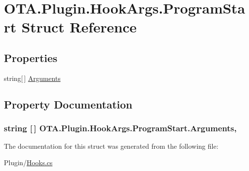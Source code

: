 \hypertarget{struct_o_t_a_1_1_plugin_1_1_hook_args_1_1_program_start}{}\section{O\+T\+A.\+Plugin.\+Hook\+Args.\+Program\+Start Struct Reference}
\label{struct_o_t_a_1_1_plugin_1_1_hook_args_1_1_program_start}
\subsection*{Properties}
\begin{DoxyCompactItemize}
\item 
string\mbox{[}$\,$\mbox{]} \hyperlink{struct_o_t_a_1_1_plugin_1_1_hook_args_1_1_program_start_a7068b440d42594330a4daea4f2c1a005}{Arguments}
\end{DoxyCompactItemize}


\subsection{Property Documentation}
\hypertarget{struct_o_t_a_1_1_plugin_1_1_hook_args_1_1_program_start_a7068b440d42594330a4daea4f2c1a005}{}
\subsubsection[{Arguments}]{\setlength{\rightskip}{0pt plus 5cm}string \mbox{[}$\,$\mbox{]} O\+T\+A.\+Plugin.\+Hook\+Args.\+Program\+Start.\+Arguments\hspace{0.3cm}{\ttfamily [get]}, {\ttfamily [set]}}\label{struct_o_t_a_1_1_plugin_1_1_hook_args_1_1_program_start_a7068b440d42594330a4daea4f2c1a005}


The documentation for this struct was generated from the following file\+:\begin{DoxyCompactItemize}
\item 
Plugin/\hyperlink{_hooks_8cs}{Hooks.\+cs}\end{DoxyCompactItemize}
